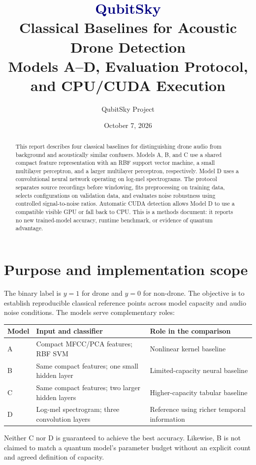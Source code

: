 \documentclass[11pt,letterpaper]{article}
\title{\textcolor{navy}{\textbf{QubitSky}}\\[6pt]
  Classical Baselines for Acoustic Drone Detection\\[5pt]
  \large Models A--D, Evaluation Protocol, and CPU/CUDA Execution}
\author{QubitSky Project}
\date{October 7, 2026}
\begin{document}
\maketitle
\thispagestyle{fancy}

\begin{abstract}
This report describes four classical baselines for distinguishing drone audio
from background and acoustically similar confusers. Models A, B, and C use a
shared compact feature representation with an RBF support vector machine, a
small multilayer perceptron, and a larger multilayer perceptron, respectively.
Model D uses a convolutional neural network operating on log-mel spectrograms.
The protocol separates source recordings before windowing, fits preprocessing
on training data, selects configurations on validation data, and evaluates noise
robustness using controlled signal-to-noise ratios. Automatic CUDA detection
allows Model D to use a compatible visible GPU or fall back to CPU.
This is a methods document: it reports no new trained-model accuracy, runtime
benchmark, or evidence of quantum advantage.
\end{abstract}

\section{Purpose and implementation scope}
The binary label is $y=1$ for drone and $y=0$ for non-drone. The objective is to
establish reproducible classical reference points across model capacity and
audio noise conditions. The models serve complementary roles:

\begin{center}
\small
\begin{tabularx}{\linewidth}{@{}lYY@{}}
\toprule
Model & Input and classifier & Role in the comparison \\
\midrule
A & Compact MFCC/PCA features; RBF SVM & Nonlinear kernel baseline \\
B & Same compact features; one small hidden layer & Limited-capacity neural baseline \\
C & Same compact features; two larger hidden layers & Higher-capacity tabular baseline \\
D & Log-mel spectrogram; three convolution layers & Reference using richer temporal information \\
\bottomrule
\end{tabularx}
\end{center}

Neither C nor D is guaranteed to achieve the best accuracy. Likewise, B is not
claimed to match a quantum model's parameter budget without an explicit count
and agreed definition of capacity.
\end{document}

